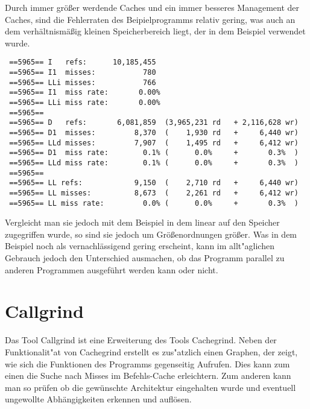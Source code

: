  Durch immer größer werdende Caches und ein immer besseres Management der Caches, sind die Fehlerraten des Beipielprogramms relativ gering, was auch an dem verhältnismäßig kleinen Speicherbereich liegt, der in dem Beispiel verwendet wurde.
 
 \begin{singlespace}
 \begin{scriptsize}
 \begin{lstlisting}
 ==5965== I   refs:      10,185,455
 ==5965== I1  misses:           780
 ==5965== LLi misses:           766
 ==5965== I1  miss rate:       0.00%
 ==5965== LLi miss rate:       0.00%
 ==5965== 
 ==5965== D   refs:       6,081,859  (3,965,231 rd   + 2,116,628 wr)
 ==5965== D1  misses:         8,370  (    1,930 rd   +     6,440 wr)
 ==5965== LLd misses:         7,907  (    1,495 rd   +     6,412 wr)
 ==5965== D1  miss rate:        0.1% (      0.0%     +       0.3%  )
 ==5965== LLd miss rate:        0.1% (      0.0%     +       0.3%  )
 ==5965== 
 ==5965== LL refs:            9,150  (    2,710 rd   +     6,440 wr)
 ==5965== LL misses:          8,673  (    2,261 rd   +     6,412 wr)
 ==5965== LL miss rate:         0.0% (      0.0%     +       0.3%  )
 \end{lstlisting}
 \end{scriptsize}
 \end{singlespace}
 
 Vergleicht man sie jedoch mit dem Beispiel in dem linear auf den Speicher zugegriffen wurde, so sind sie jedoch um Größenordnungen größer. Was in dem Beispiel noch als vernachlässigend gering erscheint, kann im allt"aglichen Gebrauch jedoch den Unterschied ausmachen, ob das Programm parallel zu anderen Programmen ausgeführt werden kann oder nicht.
 
 \begin{singlespace}
 \begin{scriptsize}
 
 \end{scriptsize}
 \end{singlespace}
 
 \section{Callgrind}
 Das Tool Callgrind ist eine Erweiterung des Tools Cachegrind. Neben der Funktionalit"at von Cachegrind erstellt es zus"atzlich einen Graphen, der zeigt, wie sich die Funktionen des Programms gegenseitig Aufrufen. Dies kann zum einen die Suche nach Misses im Befehls-Cache erleichtern. Zum anderen kann man so prüfen ob die gewünschte Architektur eingehalten wurde und eventuell ungewollte Abhängigkeiten erkennen und auflösen.